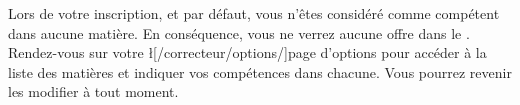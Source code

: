 ﻿Lors de votre inscription, et par défaut, vous n'êtes considéré comme compétent dans aucune matière. En conséquence, vous ne verrez aucune offre dans le . Rendez-vous sur votre \l[/correcteur/options/]{page d'options} pour accéder à la liste des matières et indiquer vos compétences dans chacune. Vous pourrez revenir les modifier à tout moment.